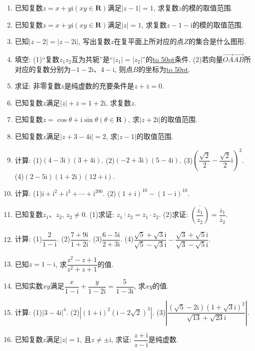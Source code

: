 \documentclass[10pt,a4paper]{article}
\newcommand{\blank}[1]{\underline{\hbox to #1pt{}}}
\begin{document}
\begin{enumerate}[1.]
\item 已知复数$z=x+y\mathrm{i}(xy\in \mathbf{R})$满足$|z-1|=1$, 求复数$z$的模的取值范围.
\item 已知复数$z=x+y\mathrm{i}(xy\in \mathbf{R})$满足$|z|=1$, 求复数$z-1-\mathrm{i}$的模的取值范围.
\item 已知$|z-2|=|z-2\mathrm{i}|$, 写出复数$z$在复平面上所对应的点$Z$的集合是什么图形.
\item 填空:
(1)``复数$z_1z_2$互为共轭''是``$|z_1|=|z_2|$''的\blank{50}条件.
(2)若向量$\overrightarrow {OA}\overrightarrow {AB}$所对应的复数分别为$-1-2\mathrm{i}$、$4-\mathrm{i}$, 则点$B$的坐标为\blank{50}.
\item 求证: 非零复数$z$是纯虚数的充要条件是$z+\overline  z=0$.
\item 已知复数$z$满足$|z|+\overline z=1+2\mathrm{i}$, 求复数$z$.
\item 已知复数$z=\cos \theta +\mathrm{i}\sin \theta (\theta \in \mathbf{R})$, 求$|z+2\mathrm{i}|$的取值范围.
\item 已知复数$z$满足$|z+3-4\mathrm{i}|=2$, 求$|z-1|$的取值范围.
\item 计算:
(1)$(4-3\mathrm{i})(3+4\mathrm{i})$.						(2)$(-2+3\mathrm{i})(5-4\mathrm{i})$.
(3)$(\dfrac{\sqrt 2}2-\dfrac{\sqrt 2}2\mathrm{i})^2$.						(4)$(2-5\mathrm{i})(1+2\mathrm{i})(12+\mathrm{i})$.
\item 计算:
(1)$\mathrm{i}+\mathrm{i}^2+\mathrm{i}^3+\cdots +\mathrm{i}^{200}$.					(2)$(1+\mathrm{i})^{10}-(1-\mathrm{i})^{10}$.
\item 已知复数$z_1$、$z_2$, $z_2\ne 0$.
(1)求证: $\overline {z_1\cdot z_2}=\overline z_1\cdot \overline z_2$.
(2)求证: $\overline {(\dfrac{z_1}{z_2})}=\dfrac{{{\overline z}_1}}{{{\overline z}_2}}$.
\item 计算:
(1)$\dfrac 2{1-\mathrm{i}}$.								(2)$\dfrac{7+9\mathrm{i}}{1+2\mathrm{i}}$.
(3)$\dfrac{6-5\mathrm{i}}{2+3\mathrm{i}}$.								(4)$\dfrac{\sqrt 5+\sqrt 3\mathrm{i}}{\sqrt 5-\sqrt 3\mathrm{i}}-\dfrac{\sqrt 3+\sqrt 5\mathrm{i}}{\sqrt 3-\sqrt 5\mathrm{i}}$.
\item 已知$z=1-\mathrm{i}$, 求$\dfrac{{z^2}-z+1}{{z^2}+z+1}$的值.
\item 已知实数$xy$满足$\dfrac x{1-\mathrm{i}}+\dfrac y{1-2\mathrm{i}}=\dfrac 5{1-3\mathrm{i}}$, 求$xy$的值.
\item 计算:
(1)$|3-4\mathrm{i}|^4$.							(2)$|(1+\mathrm{i})^2(\mathrm{i}-2\sqrt 2)^3|$.
(3)$|\dfrac{(\sqrt 5-2\mathrm{i}){{(1+\sqrt 3\mathrm{i})}^2}}{\sqrt {13}+\sqrt {23}\mathrm{i}}|$.
\item 已知复数$z$满足$|z|=1$, 且$z\ne \pm \mathrm{i}$, 求证: $\dfrac{z+{\mathrm{i}}}{z-{\mathrm{i}}}$是纯虚数.

\end{enumerate}
\end{document}
